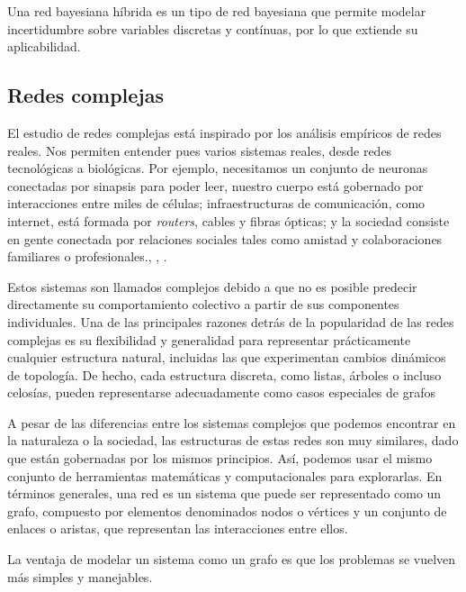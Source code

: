 \begin{definicion}\label{def:hybrid_BN}
Una red bayesiana híbrida\cite{hybrid-BN} es un tipo de red bayesiana que permite modelar incertidumbre
sobre variables discretas y contínuas, por lo que extiende su aplicabilidad.
\end{definicion}

\subsection{Redes complejas}
El estudio de redes complejas está inspirado por los análisis empíricos de redes reales. Nos permiten entender 
pues varios sistemas reales, desde redes tecnológicas a biológicas. Por ejemplo, necesitamos un conjunto de 
neuronas conectadas por sinapsis para poder leer, nuestro cuerpo está gobernado por interacciones entre miles 
de células; infraestructuras de comunicación, como internet, está formada por \textit{routers}, cables y 
fibras ópticas; y la sociedad consiste en gente conectada por relaciones sociales tales como amistad y colaboraciones 
familiares o profesionales.\cite{albert2002statistical}, \cite{barrat2008dynamical}, \cite{dorogovtsev2003evolution}.

Estos sistemas son llamados complejos debido a que no es posible predecir directamente su 
comportamiento colectivo a partir de sus componentes individuales. Una de las principales razones detrás de 
la popularidad de las redes complejas es su flexibilidad
y generalidad para representar prácticamente cualquier estructura natural, incluidas las que experimentan 
cambios dinámicos de topología. De hecho, cada estructura discreta, como listas, árboles o incluso celosías,
pueden representarse adecuadamente como casos especiales de grafos\cite{CN-review}

A pesar de las diferencias entre los sistemas complejos que podemos encontrar en la naturaleza o la sociedad, 
las estructuras de estas redes son muy similares, dado que están gobernadas por los mismos principios. Así, 
podemos usar el mismo conjunto de herramientas matemáticas y computacionales para explorarlas. En términos 
generales, una red es un sistema que puede ser representado como un grafo, compuesto por elementos denominados nodos 
o vértices y un conjunto de enlaces o aristas, que representan las interacciones entre ellos.\cite{caldarelli2007scale}

La ventaja de modelar un sistema como un grafo es que los problemas se vuelven más simples y manejables.

